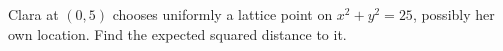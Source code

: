 Clara at $(0,5)$ chooses uniformly a lattice point on $x^2+y^2=25$, possibly her own location. Find the expected squared distance to it.
